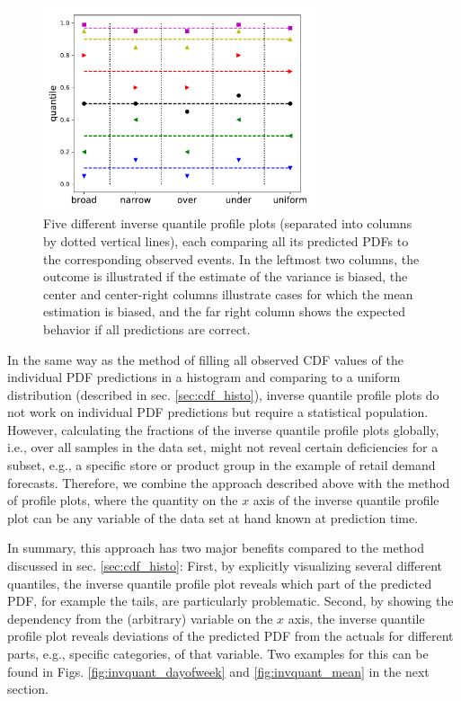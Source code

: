 \documentclass[BCOR=1mm, DIV=calc,10pt,
twoside=true,
twocolumn,
headings=normal]{scrartcl}
\begin{document}
\begin{figure}
\begin{center}
\includegraphics[width=8cm]{invquant_example}
\caption{\label{fig:invquant_example} Five different inverse quantile profile plots (separated into columns by dotted vertical lines), each comparing all its predicted PDFs to the corresponding observed events. In the leftmost two columns, the outcome is illustrated if the estimate of the variance is biased, the center and center-right columns illustrate cases for which the mean estimation is biased, and the far right column shows the expected behavior if all predictions are correct.}
\end{center}
\end{figure}

In the same way as the method of filling all observed CDF values of the individual PDF predictions in a histogram and comparing to a uniform distribution (described in sec. \ref{sec:cdf_histo}), inverse quantile profile plots do not work on individual PDF predictions but require a statistical population. However, calculating the fractions of the inverse quantile profile plots globally, i.e., over all samples in the data set, might not reveal certain deficiencies for a subset, e.g., a specific store or product group in the example of retail demand forecasts. Therefore, we combine the approach described above with the method of profile plots, where the quantity on the $x$ axis of the inverse quantile profile plot can be any variable of the data set at hand known at prediction time.

In summary, this approach has two major benefits compared to the method discussed in sec. \ref{sec:cdf_histo}: First, by explicitly visualizing several different quantiles, the inverse quantile profile plot reveals which part of the predicted PDF, for example the tails, are particularly problematic. Second, by showing the dependency from the (arbitrary) variable on the $x$ axis, the inverse quantile profile plot reveals deviations of the predicted PDF from the actuals for different parts, e.g., specific categories, of that variable. Two examples for this can be found in Figs. \ref{fig:invquant_dayofweek} and \ref{fig:invquant_mean} in the next section.
\end{document}
